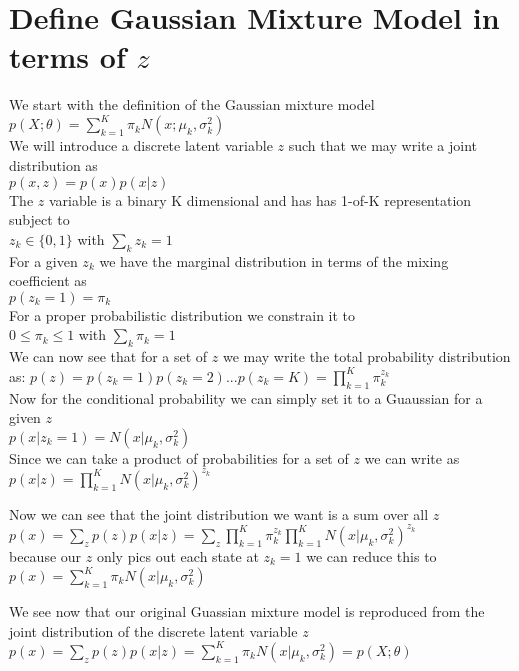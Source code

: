 \documentclass[12pt]{article}
\begin{document}
\section{Define Gaussian Mixture Model in terms of $z$}
\begin{center}
We start with the definition of the Gaussian mixture model \\
$p(X;\theta) = \sum_{k=1}^{K} \pi_k N(x; \mu_k, \sigma_k^2)$ \\
We will introduce a discrete latent variable $z$ such that we may write a joint distribution as\\
$p(x,z) = p(x)p(x|z)$ \\
The $z$ variable is a binary K dimensional and has has 1-of-K representation subject to\\
$z_k \in \{0,1\}$ with $\sum_k z_k = 1$ \\
For a given $z_k$ we have the marginal distribution in terms of the mixing coefficient as\\
$p(z_k = 1) = \pi_k$ \\
For a proper probabilistic distribution we constrain it to \\
$0 \leqslant \pi_k \leqslant 1$ with $\sum_k \pi_k = 1$ \\
We can now see that for a set of $z$ we may write the total probability distribution as:
$p(z)=p(z_k = 1)p(z_k = 2)...p(z_k = K)=\prod_{k=1}^K \pi_{k}^{z_k}$ \\
Now for the conditional probability we can simply set it to a Guaussian for a given $z$ \\
$p(x|z_k=1)=N(x| \mu_k, \sigma_k^2)$ \\
Since we can take a product of probabilities for a set of $z$ we can write as \\
$p(x|z)=\prod_{k=1}^{K} N(x| \mu_k, \sigma_k^2)^{z_k}$

Now we can see that the joint distribution we want is a sum over all $z$\\
$p(x) = \sum_z p(z)p(x|z) = \sum_z \prod_{k=1}^K \pi_{k}^{z_k} \prod_{k=1}^{K} N(x| \mu_k, \sigma_k^2)^{z_k} $ \\
because our $z$ only pics out each state at $z_k=1$ we can reduce this to \\
$p(x) = \sum_{k=1}^K \pi_k  N(x| \mu_k, \sigma_k^2)$

We see now that our original Guassian mixture model is reproduced from the joint distribution of the discrete latent variable $z$ \\
$p(x) = \sum_z p(z)p(x|z) = \sum_{k=1}^K \pi_k  N(x| \mu_k, \sigma_k^2) = p(X;\theta)$
 \newline
 \newline
\end{center}
\end{document}
